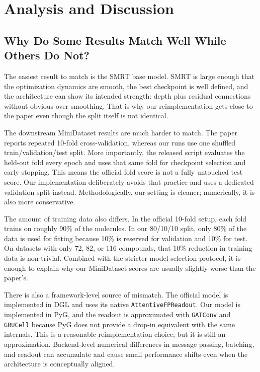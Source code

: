 \section{Analysis and Discussion}

\subsection{Why Do Some Results Match Well While Others Do Not?}

The easiest result to match is the SMRT base model. SMRT is large enough that the optimization dynamics are smooth, the best checkpoint is well defined, and the architecture can show its intended strength: depth plus residual connections without obvious over-smoothing. That is why our reimplementation gets close to the paper even though the split itself is not identical.

The downstream MiniDataset results are much harder to match. The paper reports repeated 10-fold cross-validation, whereas our runs use one shuffled train/validation/test split. More importantly, the released  script evaluates the held-out fold every epoch and uses that same fold for checkpoint selection and early stopping. This means the official fold score is not a fully untouched test score. Our implementation deliberately avoids that practice and uses a dedicated validation split instead. Methodologically, our setting is cleaner; numerically, it is also more conservative.

The amount of training data also differs. In the official 10-fold setup, each fold trains on roughly 90\% of the molecules. In our 80/10/10 split, only 80\% of the data is used for fitting because 10\% is reserved for validation and 10\% for test. On datasets with only 72, 82, or 116 compounds, that 10\% reduction in training data is non-trivial. Combined with the stricter model-selection protocol, it is enough to explain why our MiniDataset scores are usually slightly worse than the paper's.

There is also a framework-level source of mismatch. The official model is implemented in DGL and uses its native \texttt{AttentiveFPReadout}. Our model is implemented in PyG, and the readout is approximated with \texttt{GATConv} and \texttt{GRUCell} because PyG does not provide a drop-in equivalent with the same internals. This is a reasonable reimplementation choice, but it is still an approximation. Backend-level numerical differences in message passing, batching, and readout can accumulate and cause small performance shifts even when the architecture is conceptually aligned.

